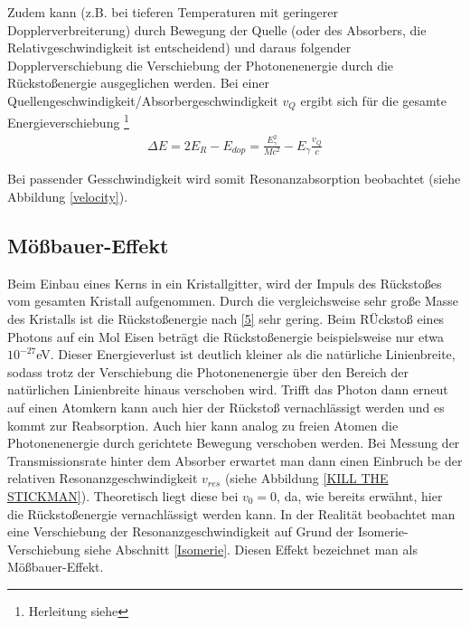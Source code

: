 
Zudem kann (z.B. bei tieferen Temperaturen mit geringerer Dopplerverbreiterung) durch Bewegung der Quelle (oder des Absorbers, die Relativgeschwindigkeit ist entscheidend) und daraus folgender Dopplerverschiebung die Verschiebung der Photonenenergie durch die Rückstoßenergie ausgeglichen werden.
Bei einer Quellengeschwindigkeit/Absorbergeschwindigkeit $v_Q$ ergibt sich für die gesamte Energieverschiebung \footnote{Herleitung siehe} %
\begin{align}
\Delta E = 2E_R - E_{dop} = \frac{E_{\gamma}^2}{Mc^2} - E_{\gamma}\frac{v_Q}{c}
\end{align}

Bei passender Gesschwindigkeit wird somit Resonanzabsorption beobachtet (siehe Abbildung \ref{velocity}).\cite{jakobs}


\subsection{ Mößbauer-Effekt}

Beim Einbau eines Kerns in ein Kristallgitter, wird der Impuls des Rückstoßes vom gesamten Kristall aufgenommen. Durch die vergleichsweise sehr große Masse des Kristalls ist die Rückstoßenergie nach \ref{5} sehr gering. Beim RÜckstoß eines Photons auf ein Mol Eisen beträgt die Rückstoßenergie beispielsweise nur etwa $10^{-27}$eV. Dieser Energieverlust ist deutlich kleiner als die natürliche Linienbreite, sodass trotz der Verschiebung die Photonenenergie über den Bereich der natürlichen Linienbreite hinaus verschoben wird. Trifft das Photon dann erneut auf einen Atomkern kann auch hier der Rückstoß vernachlässigt werden und es kommt zur Reabsorption. 
Auch hier kann analog zu freien Atomen die Photonenenergie durch gerichtete Bewegung verschoben werden. Bei Messung der Transmissionsrate hinter dem Absorber erwartet man dann einen Einbruch be der relativen Resonanzgeschwindigkeit $v_{res}$ (siehe Abbildung \ref{KILL THE STICKMAN}). Theoretisch liegt diese bei $v_0=0$, da, wie bereits erwähnt, hier die Rückstoßenergie vernachlässigt werden kann. In der Realität beobachtet man eine Verschiebung der Resonanzgeschwindigkeit auf Grund der Isomerie-Verschiebung siehe Abschnitt \ref{Isomerie}.  
Diesen Effekt bezeichnet man als Mößbauer-Effekt.\cite{jakobs}

